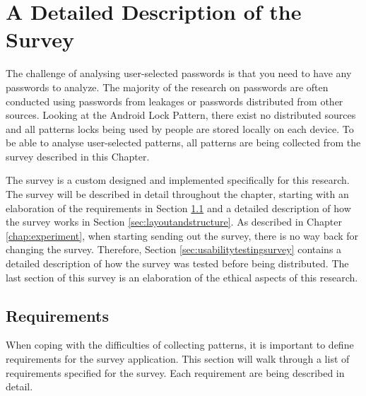 \chapter{A Detailed Description of the Survey}\label{sec:survey}
  
  The challenge of analysing user-selected passwords is that you need to have any passwords to analyze. The majority of the research on passwords are often conducted using passwords from leakages or passwords distributed from other sources. Looking at the Android Lock Pattern, there exist no distributed sources and all patterns locks being used by people are stored locally on each device. To be able to analyse user-selected patterns, all patterns are being collected from the survey described in this Chapter. 

  The survey is a custom designed and implemented specifically for this research. The survey will be described in detail throughout the chapter, starting with an elaboration of the requirements in Section \ref{sec:requirementstosurvey} and a detailed description of how the survey works in Section \ref{sec:layoutandstructure}. As described in Chapter \ref{chap:experiment}, when starting sending out the survey, there is no way back for changing the survey. Therefore, Section \ref{sec:usabilitytestingsurvey} contains a detailed description of how the survey was tested before being distributed. The last section of this survey is an elaboration of the ethical aspects of this research. 

  \clearpage
  \section{Requirements}\label{sec:requirementstosurvey}

    When coping with the difficulties of collecting patterns, it is important to define requirements for the survey application. This section will walk through a list of requirements specified for the survey. Each requirement are being described in detail. 

